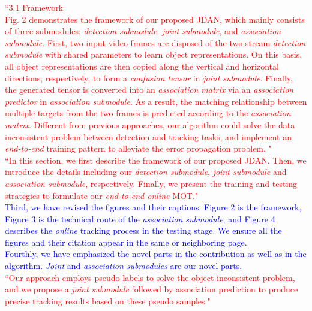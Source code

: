 \documentclass[12pt,journal,onecolumn]{IEEEtran}
\begin{document}
\textcolor{red}{
``3.1 Framework \\ 
Fig. 2 demonstrates the framework of our proposed JDAN,
which mainly consists of three submodules: \emph{detection submodule}, \emph{joint submodule}, and \emph{association submodule}.
First, two input video frames are disposed of the two-stream \emph{detection submodule} with shared parameters to learn object representations. 
On this basis, all object representations are then copied along the vertical and horizontal directions, respectively, to form a \emph{confusion tensor} in \emph{joint submodule}. 
Finally, the generated tensor is converted into an \emph{association matrix} via an \emph{association predictor} in \emph{association submodule}. 
As a result, the matching relationship between multiple targets from the two frames is predicted according to the \emph{association matrix}.
Different from previous approaches, our algorithm could solve the data inconsistent problem between detection and tracking tasks, and implement an \emph{end-to-end} training pattern to alleviate the error propagation problem. 
"
} \\
\textcolor{red}{
``In this section, we first describe the framework of our proposed JDAN.
Then, we introduce the details including our \emph{detection submodule}, \emph{joint submodule} and \emph{association submodule}, respectively.
Finally, we present the training and testing strategies to formulate our \emph{end-to-end online} MOT."
} \\
\textcolor{blue}{
Third, we have revised the figures and their captions.
Figure 2 is the framework, Figure 3 is the technical route of the \emph{association submodule}, and Figure 4 describes the \emph{online} tracking process in the testing stage.
We ensure all the figures and their citation appear in the same or neighboring page.
} \\
\textcolor{blue}{
Fourthly, we have emphasized the novel parts in the contribution as well as in the algorithm.
\emph{Joint} and \emph{association submodules} are our novel parts.
} \\
\textcolor{red}{
``Our approach employs pseudo labels to solve the object inconsistent problem, and we propose a \emph{joint submodule} followed by association prediction to produce precise tracking results based on these pseudo samples."
} \\
\end{document}
